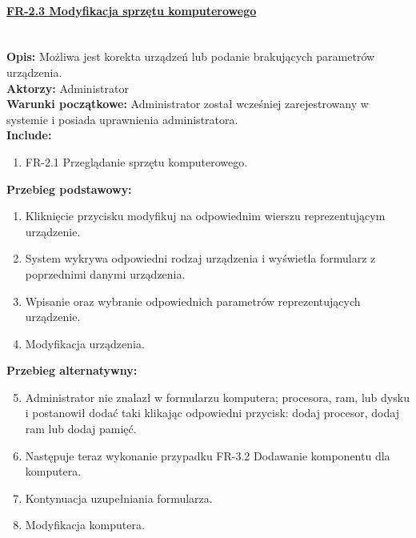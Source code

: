 \paragraph{\underline{FR-2.3 Modyfikacja sprzętu komputerowego}}\mbox{}\\[1mm]
	\noindent\textbf{Opis:} Możliwa jest korekta urządzeń lub podanie brakujących parametrów urządzenia.\\
	\noindent\textbf{Aktorzy:} Administrator\\
	\textbf{Warunki początkowe:} Administrator został wcześniej zarejestrowany w systemie i posiada uprawnienia administratora.\\
	\textbf{Include:} 
	\begin{enumerate}[noparskip]
		\item FR-2.1 Przeglądanie sprzętu komputerowego.
	\end{enumerate}
	\textbf{Przebieg podstawowy:}
	\begin{enumerate}[noparskip]
    \item Kliknięcie przycisku modyfikuj na odpowiednim wierszu reprezentującym urządzenie.
	  \item System wykrywa odpowiedni rodzaj urządzenia i wyświetla formularz z poprzednimi danymi urządzenia.
	  \item Wpisanie oraz wybranie odpowiednich parametrów reprezentujących urządzenie.
	  \item Modyfikacja urządzenia.
	\end{enumerate} 
	\textbf{Przebieg alternatywny:}
	\begin{enumerate}[noparskip]\setcounter{enumi}{4}
		\item Administrator nie znalazł w formularzu komputera; procesora, ram, lub dysku i postanowił dodać taki klikając odpowiedni przycisk: dodaj procesor, dodaj ram lub dodaj pamięć.
		\item Następuje teraz wykonanie przypadku FR-3.2 Dodawanie komponentu dla komputera.
		\item Kontynuacja uzupełniania formularza.
		\item Modyfikacja komputera.
	\end{enumerate} \mbox{}\\[-11mm]
	
